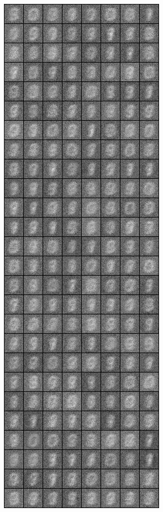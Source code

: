 \begin{figure}
\includegraphics[width=\picwidth\columnwidth]{figures/supplementary/mnist/image_200.png}\\

\end{figure}
